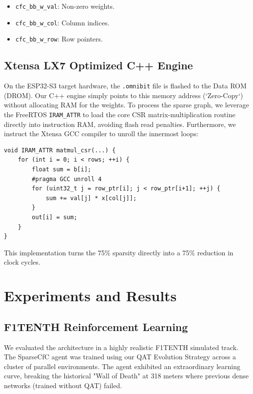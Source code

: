 \documentclass[lettersize,journal]{IEEEtran}
\begin{document}
\begin{itemize}
    \item \texttt{cfc\_bb\_w\_val}: Non-zero weights.
    \item \texttt{cfc\_bb\_w\_col}: Column indices.
    \item \texttt{cfc\_bb\_w\_row}: Row pointers.
\end{itemize}

\subsection{Xtensa LX7 Optimized C++ Engine}
On the ESP32-S3 target hardware, the \texttt{.omnibit} file is flashed to the Data ROM (DROM). Our C++ engine simply points to this memory address (`Zero-Copy`) without allocating RAM for the weights. 
To process the sparse graph, we leverage the FreeRTOS \texttt{IRAM\_ATTR} to load the core CSR matrix-multiplication routine directly into instruction RAM, avoiding flash read penalties. Furthermore, we instruct the Xtensa GCC compiler to unroll the innermost loops:

\begin{verbatim}
void IRAM_ATTR matmul_csr(...) {
    for (int i = 0; i < rows; ++i) {
        float sum = b[i];
        #pragma GCC unroll 4
        for (uint32_t j = row_ptr[i]; j < row_ptr[i+1]; ++j) {
            sum += val[j] * x[col[j]];
        }
        out[i] = sum;
    }
}
\end{verbatim}
This implementation turns the 75\% sparsity directly into a 75\% reduction in clock cycles.

\section{Experiments and Results}

\subsection{F1TENTH Reinforcement Learning}
We evaluated the architecture in a highly realistic F1TENTH simulated track. The SparseCfC agent was trained using our QAT Evolution Strategy across a cluster of parallel environments. 
The agent exhibited an extraordinary learning curve, breaking the historical "Wall of Death" at 318 meters where previous dense networks (trained without QAT) failed.
\end{document}
